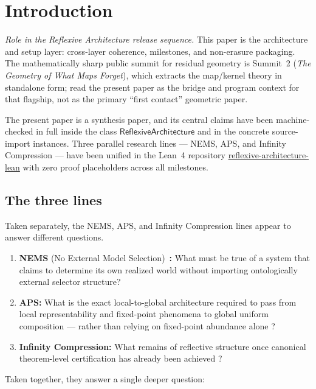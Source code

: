 \documentclass[11pt]{article}
\newcommand{\RAL}{\ensuremath{\mathsf{ReflexiveArchitecture}}}
\begin{document}
\tableofcontents
\newpage

\section{Introduction}

\noindent\textit{Role in the Reflexive Architecture release sequence.} This paper is the architecture and setup layer: cross-layer coherence, milestones, and non-erasure packaging. The mathematically sharp public summit for residual geometry is Summit~2 (\emph{The Geometry of What Maps Forget}), which extracts the map/kernel theory in standalone form; read the present paper as the bridge and program context for that flagship, not as the primary ``first contact'' geometric paper.

\medskip

The present paper is a synthesis paper, and its central claims have been
machine-checked in full inside the class $\RAL$ and in the concrete source-import
instances.  Three parallel research lines --- NEMS, APS, and Infinity Compression ---
have been unified in the Lean~4 repository \url{reflexive-architecture-lean} with
zero proof placeholders across all milestones.

\subsection{The three lines}

Taken separately, the NEMS, APS, and Infinity Compression lines appear to answer
different questions.

\begin{enumerate}[leftmargin=2em]
\item \textbf{NEMS} (No External Model Selection)~\cite{SpivackNEMS01-2026,SpivackNEMS08-2026}\textbf{:} What must be true of a system that claims to determine its own
realized world without importing ontologically external selector structure?
\item \textbf{APS:} What is the exact local-to-global architecture required to pass from
local representability and fixed-point phenomena to global uniform composition --- rather
than relying on fixed-point abundance alone \cite{SpivackAPS2026}?
\item \textbf{Infinity Compression:} What remains of reflective structure once
canonical theorem-level certification has already been achieved \cite{SpivackIC2026}?
\end{enumerate}

Taken together, they answer a single deeper question:
\end{document}
